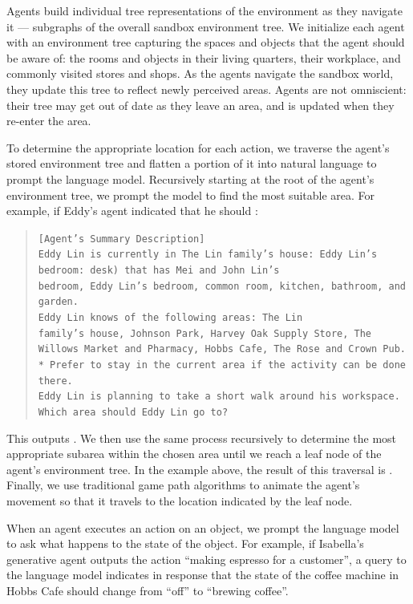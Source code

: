 Agents build individual tree representations of the environment as they navigate it --- subgraphs of the overall sandbox environment tree. We initialize each agent with an environment tree capturing the spaces and objects that the agent should be aware of: the rooms and objects in their living quarters, their workplace, and commonly visited stores and shops. As the agents navigate the sandbox world, they update this tree to reflect newly perceived areas. Agents are not omniscient: their tree may get out of date as they leave an area, and is updated when they re-enter the area.

To determine the appropriate location for each action, we traverse the agent's stored environment tree and flatten a portion of it into natural language to prompt the language model. Recursively starting at the root of the agent's environment tree, we prompt the model to find the most suitable area. For example, if Eddy's agent indicated that he should  :
\begin{quote}
    {\small
    \texttt{[Agent’s Summary Description]\\
            Eddy Lin is currently in {The Lin family’s house: Eddy Lin’s bedroom: desk)} that has Mei and John Lin’s \\bedroom, Eddy Lin’s bedroom, common room, kitchen, bathroom, and garden. \\
            Eddy Lin knows of the following areas: {The Lin \\family’s house, Johnson Park, Harvey Oak Supply Store, The Willows Market and Pharmacy, Hobbs Cafe, The Rose and Crown Pub}. \\
            * Prefer to stay in the current area if the activity can be done there. \\
            Eddy Lin is planning to take a short walk around his workspace. Which area should Eddy Lin go to? 
    }
    }
\end{quote}
This outputs . We then use the same process recursively to determine the most appropriate subarea within the chosen area until we reach a leaf node of the agent's environment tree. In the example above, the result of this traversal is . Finally, we use traditional game path algorithms to animate the agent's movement so that it travels to the location indicated by the leaf node.

When an agent executes an action on an object, we prompt the language model to ask what happens to the state of the object. For example, if Isabella's generative agent outputs the action ``making espresso for a customer'', a query to the language model indicates in response that the state of the coffee machine in Hobbs Cafe should change from ``off'' to ``brewing coffee''.

